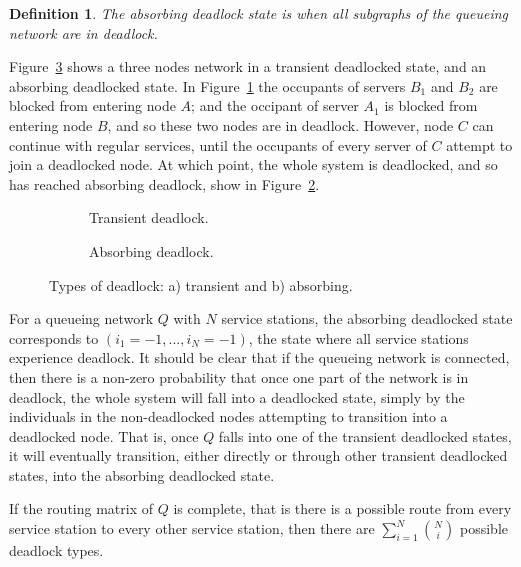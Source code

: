 \documentclass{article}
\newtheorem{definition}{Definition}
\begin{document}
\begin{definition}
    The absorbing deadlock state is when all subgraphs of the
    queueing network are in deadlock.\\
\end{definition}

Figure~\ref{fig:transabsorb} shows a three nodes network in a transient deadlocked state, and an absorbing deadlocked state.
In Figure~\ref{fig:trans} the occupants of servers $B_1$ and $B_2$ are blocked from entering node $A$; and the occipant of server $A_1$ is blocked from entering node $B$, and so these two nodes are in deadlock.
However, node $C$ can continue with regular services, until the occupants of every server of $C$ attempt to join a deadlocked node.
At which point, the whole system is deadlocked, and so has reached absorbing deadlock, show in Figure~\ref{fig:absorb}.

\begin{figure}[H]
\begin{subfigure}[b]{0.5\textwidth}
  
  \caption{Transient deadlock.}
  \label{fig:trans}
\end{subfigure}
\begin{subfigure}[b]{0.5\textwidth}
  
  \caption{Absorbing deadlock.}
  \label{fig:absorb}
\end{subfigure}
\caption{Types of deadlock: a) transient and b) absorbing.}
\label{fig:transabsorb}
\end{figure}

For a queueing network $Q$ with $N$ service stations, the absorbing deadlocked state corresponds to $(i_1=-1,...,i_N=-1)$, the state where all service stations experience deadlock.
It should be clear that if the queueing network is connected, then there is a non-zero probability that once one part of the network is in deadlock, the whole system will fall into a deadlocked state, simply by the individuals in the non-deadlocked nodes attempting to transition into a deadlocked node.
That is, once $Q$ falls into one of the transient deadlocked states, it will eventually transition, either directly or through other transient deadlocked states, into the absorbing deadlocked state.

If the routing matrix of $Q$ is complete, that is there is a possible route from every service station to every other service station, then there are $\sum_{i=1}^N \binom{N}{i}$ possible deadlock types.
\end{document}
